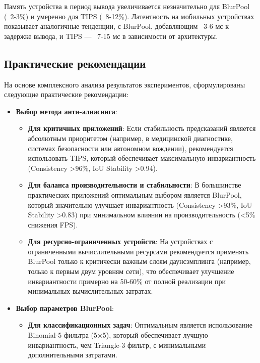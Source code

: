 Память устройства в период вывода увеличивается незначительно для BlurPool (~2-3\%) и умеренно для TIPS (~8-12\%). Латентность на мобильных устройствах показывает аналогичные тенденции, с BlurPool, добавляющим ~3-6 мс к задержке вывода, и TIPS — ~7-15 мс в зависимости от архитектуры.

\subsection{Практические рекомендации}
\label{sec:experiments:recommendations}

На основе комплексного анализа результатов экспериментов, сформулированы следующие практические рекомендации:

\begin{itemize}
    \item \textbf{Выбор метода анти-алиасинга}:
    \begin{itemize}
        \item \textbf{Для критичных приложений}: Если стабильность предсказаний является абсолютным приоритетом (например, в медицинской диагностике, системах безопасности или автономном вождении), рекомендуется использовать TIPS, который обеспечивает максимальную инвариантность (Consistency >96\%, IoU Stability >0.94).
        
        \item \textbf{Для баланса производительности и стабильности}: В большинстве практических приложений оптимальным выбором является BlurPool, который значительно улучшает инвариантность (Consistency >93\%, IoU Stability >0.83) при минимальном влиянии на производительность (<5\% снижения FPS).
        
        \item \textbf{Для ресурсно-ограниченных устройств}: На устройствах с ограниченными вычислительными ресурсами рекомендуется применять BlurPool только к критически важным слоям даунсэмплинга (например, только к первым двум уровням сети), что обеспечивает улучшение инвариантности примерно на 50-60\% от полной реализации при минимальных вычислительных затратах.
    \end{itemize}
    
    \item \textbf{Выбор параметров BlurPool}:
    \begin{itemize}
        \item \textbf{Для классификационных задач}: Оптимальным является использование Binomial-5 фильтра (5×5), который обеспечивает лучшую инвариантность, чем Triangle-3 фильтр, с минимальными дополнительными затратами.
        

\end{itemize}
\end{itemize}
